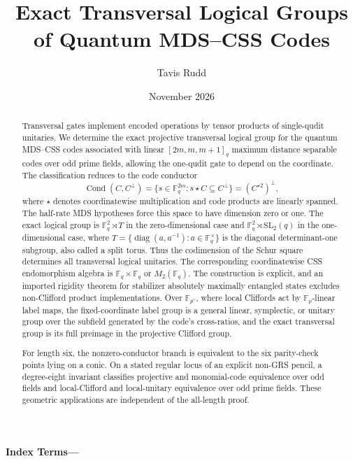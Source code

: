 \documentclass[11pt]{article}
\title{Exact Transversal Logical Groups of Quantum MDS--CSS Codes}
\author{Tavis Rudd}
\date{November 2026}
\numberwithin{equation}{section}
\theoremstyle{upright}
\theoremstyle{definition}
\theoremstyle{remark}
\newcommand{\F}{\mathbb F}
\newcommand{\diag}{\operatorname{diag}}
\newcommand{\Cond}{\operatorname{Cond}}
\begin{document}
\maketitle

\begin{abstract}
Transversal gates implement encoded operations by tensor products of
single-qudit unitaries.  We determine the exact projective transversal
logical group for the quantum MDS--CSS codes associated with linear
\([2m,m,m+1]_q\) maximum distance separable codes over odd prime fields,
allowing the one-qudit gate to depend on the coordinate.  The classification
reduces to the code conductor
\[
 \Cond(C,C^\perp)
 =\{s\in\F_q^{2m}:s\star C\subseteq C^\perp\}
 =(C^{\star2})^\perp,
\]
where \(\star\) denotes coordinatewise multiplication and code products are
linearly spanned.  The half-rate MDS hypotheses force this space to have
dimension zero or one.  The exact
logical group is \(\F_q^2\rtimes T\) in the zero-dimensional case and
\(\F_q^2\rtimes\mathrm{SL}_2(q)\) in the one-dimensional case, where
\(T=\{\diag(a,a^{-1}):a\in\F_q^\times\}\) is the diagonal
determinant-one subgroup, also called a split torus.  Thus the codimension of
the Schur square determines
all transversal logical unitaries.  The corresponding coordinatewise CSS
endomorphism algebra is \(\F_q\times\F_q\) or \(M_2(\F_q)\).  The
construction is explicit, and an imported rigidity theorem for stabilizer
absolutely maximally entangled states excludes non-Clifford product
implementations.  Over \(\F_{p^e}\), where local Cliffords act by
\(\F_p\)-linear label maps, the fixed-coordinate label group is a general
linear, symplectic, or unitary group over the subfield generated by the
code's cross-ratios, and the exact transversal group is its full preimage in
the projective Clifford group.

For length six, the nonzero-conductor branch is equivalent to the six
parity-check points lying on a conic.  On a stated regular locus of an explicit
non-GRS pencil, a degree-eight invariant classifies projective and monomial-code
equivalence over odd fields and local-Clifford and local-unitary equivalence
over odd prime fields.  These geometric applications are independent of the
all-length proof.
\end{abstract}
\noindent\textbf{Index Terms---}








\appendix







\end{document}
